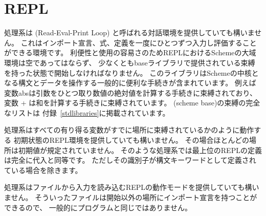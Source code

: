 \section{REPL}

処理系は  (Read-Eval-Print Loop) と呼ばれる対話環境を提供していても構いません。
これはインポート宣言、式、定義を一度にひとつずつ入力し評価することができる環境です。
利便性と使用の容易さのためREPLにおけるSchemeの大域環境は空であってはならず、
少なくともbaseライブラリで提供されている束縛を持った状態で開始しなければなりません。
このライブラリはSchemeの中核となる構文とデータを操作する一般的に便利な手続きが含まれています。
例えば変数{\cf abs}は引数をひとつ取り数値の絶対値を計算する手続きに束縛されており、
変数 {\cf +} は和を計算する手続きに束縛されています。
(scheme base)の束縛の完全なリストは
付録~\ref{stdlibraries}に掲載されています。

処理系はすべての有り得る変数がすでに場所に束縛されているかのように動作する
初期状態のREPL環境を提供していても構いません。
その場合ほとんどの場所は初期値が規定されていません。
そのような処理系では最上位のREPLの定義は完全に代入と同等です。
ただしその識別子が構文キーワードとして定義されている場合を除きます。

処理系はファイルから入力を読み込むREPLの動作モードを提供していても構いません。
そういったファイルは開始以外の場所にインポート宣言を持つことができるので、
一般的にプログラムと同じではありません。
